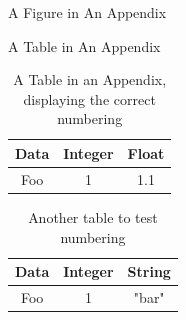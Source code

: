 \documentclass{workreport}
\begin{document}
\begin{backmatter}
\begin{appendix}{A Figure in An Appendix}
\end{appendix}

\begin{appendix}{A Table in An Appendix}
        
        \lipsum[1-2]

        \begin{table}
		\centering
		
		\begin{tabular}{|c|c|c|} \hline
			\textbf{Data} & \textbf{Integer} & \textbf{Float} \\ \hline
			Foo & 1 & 1.1 \\ \hline
		\end{tabular}
		
		\caption{A Table in an Appendix, displaying the correct numbering}
        \end{table}

	\begin{table}
		\centering
		\begin{tabular}{|c|c|c|} \hline
			\textbf{Data} & \textbf{Integer} & \textbf{String} \\ \hline
			Foo & 1 & "bar" \\ \hline
		\end{tabular}
		\caption{Another table to test numbering}
	\end{table}

\end{appendix}

\end{backmatter}
\end{document}
